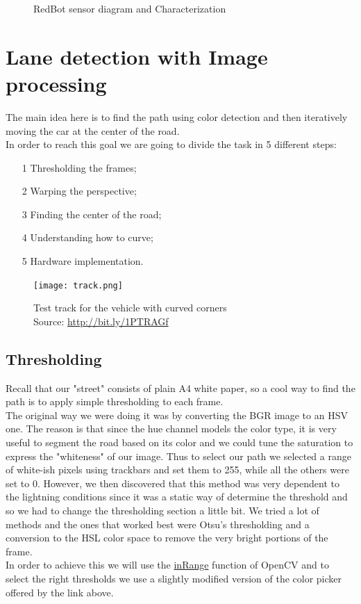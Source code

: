 \documentclass[12pt,a4paper]{article}
\begin{document}
\begin{large}
\begin{figure} [hbp]
\begin{subfigure}[b]{0.4\textwidth}
  \end{subfigure}
  \caption{RedBot sensor diagram and Characterization}
\end{figure}

\section{Lane detection with Image processing}

The main idea here is to find the path using color detection and then iteratively moving the car at the center of the road.\\
In order to reach this goal we are going to divide the task in 5 different steps:

\begin{itemize}
  \item[1] Thresholding the frames;
  \item[2] Warping the perspective;
  \item[3] Finding the center of the road;
  \item[4] Understanding how to curve;
  \item[5] Hardware implementation.
  \end{itemize}

\begin{figure}[hbp]
\centering
\texttt{[image: track.png]}
\caption{\label{fig:5}Test track for the vehicle with curved corners\\Source: \protect\url{http://bit.ly/1PTRAGf}}
\end{figure}

\subsection{Thresholding}
Recall that our "street" consists of plain A4 white paper, so a cool way to find the path is to apply simple thresholding to each frame.\\
The original way we were doing it was by converting the BGR image to an HSV one. The reason is that since the hue channel models the color type, it is very useful to segment the road based on its color and we could tune the saturation to express the "whiteness" of our image. Thus to select our path we selected a range of white-ish pixels using trackbars and set them to 255, while all the others were set to 0. However, we then discovered that this method was very dependent to the lightning conditions since it was a static way of determine the threshold and so we had to change the thresholding section a little bit. We tried a lot of methods and the ones that worked best were Otsu's thresholding and a conversion to the HSL color space to remove the very bright portions of the frame.\\
In order to achieve this we will use the \href{https://docs.opencv.org/3.4/da/d97/tutorial_threshold_inRange.html}{inRange} function of OpenCV and to select the right thresholds we use a slightly modified version of the color picker offered by the link above.


\end{large}
\end{document}
